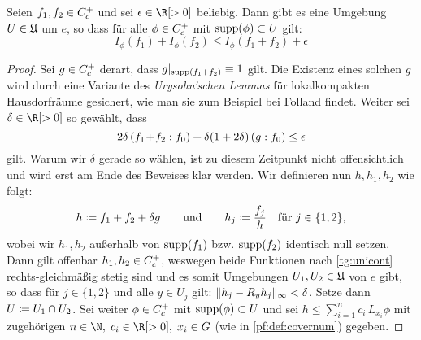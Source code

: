 \begin{thLemma}
    \label{pf:approxadditive}
    Seien $f_1,f_2 \in C_c^+$ und sei $\epsilon\in\R[>0]$ beliebig.
    Dann gibt es eine Umgebung $U\in\mathfrak{U}$ um $e$, so dass für alle
    $\phi\in C_c^+$ mit $\operatorname{supp}(\phi)\subset U$ gilt:
    \[ I_\phi(f_1) + I_\phi(f_2) \leq I_\phi(f_1+f_2) + \epsilon  \]
\end{thLemma}

\begin{proof}
    Sei $g\in C_c^+$ derart, dass $g\vert_{\operatorname{supp}(f_1+f_2)} \equiv 1$
    gilt. Die Existenz eines solchen $g$ wird durch eine Variante des
    \emph{Urysohn'schen Lemmas} für lokalkompakten Hausdorfräume gesichert,
    wie man sie zum Beispiel bei Folland\cite[Ch.\,4,\;\S4.32]{bookc:folland99} 
    findet. Weiter sei $\delta\in\R[>0]$ so gewählt, dass
    \[ 2\delta\, (f_1\mkern1mu{+}\mkern1mu f_2 : f_0) 
        + \delta(1+2\delta) \, (g : f_0) \leq \epsilon
    \]
    gilt. Warum wir $\delta$ gerade so wählen, ist zu diesem Zeitpunkt nicht
    offensichtlich und wird erst am Ende des Beweises klar werden.
    Wir definieren nun $h,h_1,h_2$ wie folgt:
    \[ h \coloneqq f_1+f_2+\delta g \qquad\text{und}\qquad
        h_j \coloneqq \frac{f_j}{h} \quad \text{für $j\in\{1,2\}$,}
    \]
    wobei wir $h_1,h_2$ außerhalb von $\operatorname{supp}(f_1)$ bzw. $\operatorname{supp}(f_2)$ identisch
    null setzen. Dann gilt offenbar $h_1,h_2\in C_c^+$, weswegen beide
    Funktionen nach \cref{tg:unicont} rechts-gleichmäßig stetig sind und es somit
    Umgebungen $U_1,U_2\in\mathfrak{U}$ von $e$ gibt, so dass für $j\in\{1,2\}$ und
    alle $y\in U_j$ gilt: $\lVert h_j - R_yh_j\rVert_\infty < \delta$. Setze dann $U\coloneqq
    U_1\cap U_2$. Sei weiter $\phi\in C_c^+$ mit $\operatorname{supp}(\phi)\subset U$ und 
    sei $h\leq \sum_{i=1}^n c_i\,L_{x_i}\phi$ mit zugehörigen
    $n\in\N,\;c_i\in\R[>0],\; x_i\in G$ (wie in \cref{pf:def:covernum}) gegeben.
    

\end{proof}
